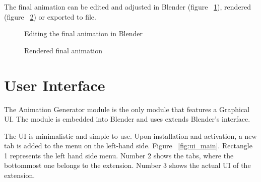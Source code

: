 The final animation can be edited and adjusted in Blender (figure ~\ref{fig:finalblend}), rendered (figure ~\ref{fig:finalrend}) or exported to file.


\begin{figure}[H]
\centerline{}
\caption{Editing the final animation in Blender}\label{fig:finalblend}
\end{figure}
\begin{figure}[H]
\centerline{}
\caption{Rendered final animation}\label{fig:finalrend}
\end{figure}

\section{User Interface}

The Animation Generator module is the only module that features a Graphical UI. The module is embedded into Blender and uses extends Blender's interface. 

The UI is minimalistic and simple to use. Upon installation and activation, a new tab is added to the menu on the left-hand side. Figure ~\ref {fig:ui_main}. Rectangle 1 represents the left hand side menu. Number 2 shows the tabs, where the bottommost one belongs to the extension. Number 3 shows the actual UI of the extension.

